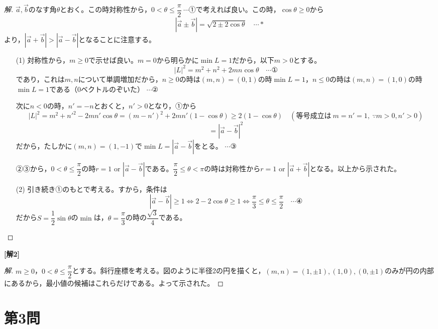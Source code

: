 \documentclass[../main.tex]{subfiles}
\begin{document}
\begin{proof}[解]
  $\vec a,\vec b$のなす角$\theta$とおく。この時対称性から，$0<\theta\le\dfrac{\pi}{2}\ \cdots$①で考えれば良い。この時，$\cos\theta\ge0$から
  \[
    |\vec a\pm\vec b|=\sqrt{2\pm2\cos\theta} \quad \cdots *
  \]
  より，$|\vec a+\vec b|>|\vec a-\vec b|$となることに注意する。

  \begin{enumerate}
    \item[(1)] 対称性から，$m\ge0$で示せば良い。$m=0$から明らかに$\min L=1$だから，以下$m>0$とする。
      \[
        |L|^2=m^2+n^2+2mn\cos\theta \quad \cdots \text{①}
      \]
      であり，これは$m,n$について単調増加だから，$n\ge0$の時は$(m,n)=(0,1)$の時$\min L=1$，$n\le0$の時は$(m,n)=(1,0)$の時$\min L=1$である（0ベクトルのぞいた） $\cdots$②

      次に$n<0$の時，$n'=-n$とおくと，$n'>0$となり，①から
      \[
        |L|^2=m^2+n'^2-2mn'\cos\theta=(m-n')^2+2mn'(1-\cos\theta)\ge2(1-\cos\theta)\quad(\text{等号成立は}\ m=n'=1,\ \because m>0,n'>0)
      \]
      \[
        =|\vec a-\vec b|^2
      \]
      だから，たしかに$(m,n)=(1,-1)$で$\min L=|\vec a-\vec b|$をとる。 $\cdots$③

      ②③から，$0<\theta\le\dfrac{\pi}{2}$の時$r=1$ or $|\vec a-\vec b|$である。$\dfrac{\pi}{2}\le\theta<\pi$の時は対称性から$r=1$ or $|\vec a+\vec b|$となる。以上から示された。

    \item[(2)] 引き続き①のもとで考える。すから，条件は
      \[
        |\vec a-\vec b|\ge1 \iff 2-2\cos\theta\ge1 \iff \frac{\pi}{3}\le\theta\le\frac{\pi}{2} \quad \cdots \text{④}
      \]
      だから$S=\dfrac12\sin\theta$の$\min$は，$\theta=\dfrac{\pi}{3}$の時の$\dfrac{\sqrt3}{4}$である。
  \end{enumerate}
\end{proof}

\bigskip
\noindent\textbf{[解2]}

\begin{proof}[解]
  $m\ge0$，$0<\theta\le\dfrac{\pi}{2}$とする。斜行座標を考える。図のように半径2の円を描くと，$(m,n)=(1,\pm1),(1,0),(0,\pm1)$のみが円の内部にあるから，最小値の候補はこれらだけである。よって示された。
\end{proof}

\newpage

\section*{第3問}
\end{document}
